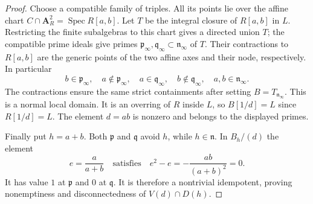 \begin{proof}
Choose a compatible family of triples. All its points lie over
the affine chart $C\cap\mathbf A^2_R=\operatorname{Spec}R[a,b]$.
Let $T$ be the integral closure of $R[a,b]$ in $L$. Restricting the
finite subalgebras to this chart gives a directed union $T$; the
compatible prime ideals give primes $\mathfrak p_\infty,
\mathfrak q_\infty\subset\mathfrak n_\infty$ of $T$.
Their contractions to $R[a,b]$ are the generic points of the two
affine axes and their node, respectively. In particular
\[
 b\in\mathfrak p_\infty,\quad a\notin\mathfrak p_\infty,
 \quad a\in\mathfrak q_\infty,\quad b\notin\mathfrak q_\infty,
 \quad a,b\in\mathfrak n_\infty.
\]
The contractions ensure the same strict containments after setting
$B=T_{\mathfrak n_\infty}$. This is a normal local domain. It is
an overring of $R$ inside $L$, so $B[1/d]=L$ since $R[1/d]=L$.
The element $d=ab$ is nonzero and belongs to the displayed primes.

Finally put $h=a+b$. Both $\mathfrak p$ and $\mathfrak q$ avoid
$h$, while $h\in\mathfrak n$. In $B_h/(d)$ the element
\[
 e=\frac{a}{a+b}
 \quad\text{satisfies}\quad
 e^2-e=-\frac{ab}{(a+b)^2}=0.
\]
It has value $1$ at $\mathfrak p$ and $0$ at $\mathfrak q$.
It is therefore a nontrivial idempotent, proving nonemptiness and
disconnectedness of $V(d)\cap D(h)$.
\end{proof}

